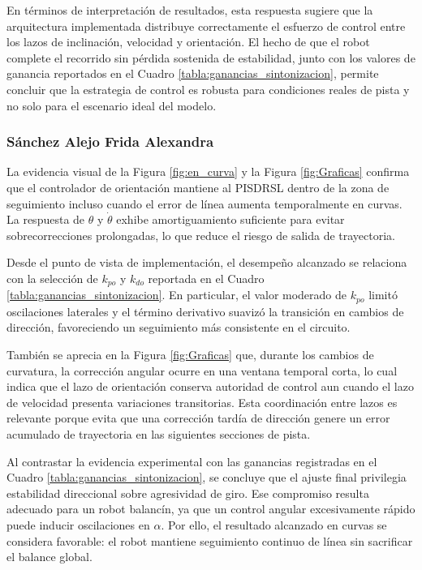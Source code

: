 \documentclass{article}
\begin{document}
En términos de interpretación de resultados, esta respuesta sugiere que la arquitectura implementada distribuye correctamente el esfuerzo de control entre los lazos de inclinación, velocidad y orientación. El hecho de que el robot complete el recorrido sin pérdida sostenida de estabilidad, junto con los valores de ganancia reportados en el Cuadro \ref{tabla:ganancias_sintonizacion}, permite concluir que la estrategia de control es robusta para condiciones reales de pista y no solo para el escenario ideal del modelo.

\subsubsection{Sánchez Alejo Frida Alexandra}
La evidencia visual de la Figura \ref{fig:en_curva} y la Figura \ref{fig:Graficas} confirma que el controlador de orientación mantiene al PISDRSL dentro de la zona de seguimiento incluso cuando el error de línea aumenta temporalmente en curvas. La respuesta de $\theta$ y $\dot{\theta}$ exhibe amortiguamiento suficiente para evitar sobrecorrecciones prolongadas, lo que reduce el riesgo de salida de trayectoria.

Desde el punto de vista de implementación, el desempeño alcanzado se relaciona con la selección de $k_{po}$ y $k_{do}$ reportada en el Cuadro \ref{tabla:ganancias_sintonizacion}. En particular, el valor moderado de $k_{po}$ limitó oscilaciones laterales y el término derivativo suavizó la transición en cambios de dirección, favoreciendo un seguimiento más consistente en el circuito.

También se aprecia en la Figura \ref{fig:Graficas} que, durante los cambios de curvatura, la corrección angular ocurre en una ventana temporal corta, lo cual indica que el lazo de orientación conserva autoridad de control aun cuando el lazo de velocidad presenta variaciones transitorias. Esta coordinación entre lazos es relevante porque evita que una corrección tardía de dirección genere un error acumulado de trayectoria en las siguientes secciones de pista.

Al contrastar la evidencia experimental con las ganancias registradas en el Cuadro \ref{tabla:ganancias_sintonizacion}, se concluye que el ajuste final privilegia estabilidad direccional sobre agresividad de giro. Ese compromiso resulta adecuado para un robot balancín, ya que un control angular excesivamente rápido puede inducir oscilaciones en $\alpha$. Por ello, el resultado alcanzado en curvas se considera favorable: el robot mantiene seguimiento continuo de línea sin sacrificar el balance global.
\end{document}
